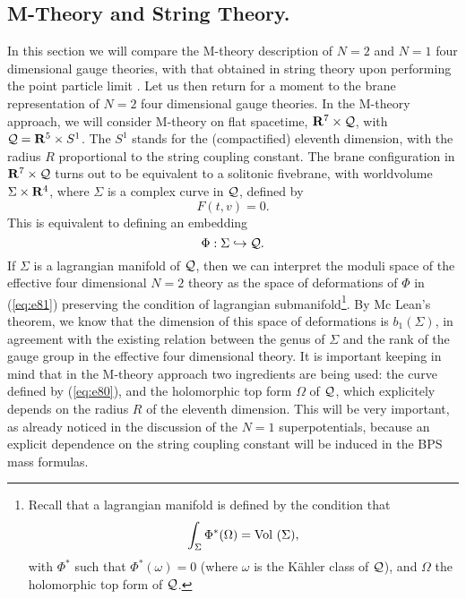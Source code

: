 \subsection{M-Theory and String Theory.}

In this section we will compare the M-theory description of $N=2$ and $N=1$ 
four dimensional gauge theories, with that obtained in string theory upon 
performing the point particle limit \cite{KKLMV,GHL1,KLMVW,GHL2}. Let us then return for a moment to the 
brane representation of $N=2$ four dimensional gauge theories. In the 
M-theory approach, we will consider M-theory on flat spacetime, ${\bf R}^7 \times {\cal Q}$, 
with ${\cal Q}= {\bf R}^5 \times S^1$. The $S^1$ stands for the (compactified)  
eleventh dimension, with the radius $R$ proportional to the string coupling constant. 
The brane configuration in ${\bf R}^7 \times {\cal Q}$ turns out to be 
equivalent to a solitonic fivebrane, with worldvolume $\Sigma \times {\bf R}^4$, where 
$\Sigma$ is a complex curve in ${\cal Q}$, defined by
\begin{equation}
F(t,v)=0.
\label{eq:e80}
\end{equation}
This is equivalent to defining an embedding
\begin{equation}
\Phi : \Sigma \hookrightarrow {\cal Q}.
\label{eq:e81}
\end{equation}
If $\Sigma$ is a lagrangian manifold of ${\cal Q}$, then we can interpret the 
moduli space of the effective four dimensional $N=2$ theory as the space of 
deformations of $\Phi$ in (\ref{eq:e81}) preserving the condition of 
lagrangian submanifold\footnote{Recall that a lagrangian manifold is defined 
by the condition that 
\[ \int_{\Sigma} \Phi^* (\Omega) = \hbox {Vol } (\Sigma), \]
with $\Phi^*$ such that $\Phi^*(\omega)=0$ (where $\omega$ is the K\"ahler class 
of ${\cal Q}$), and $\Omega$ the holomorphic top form of ${\cal Q}$.}. By 
Mc Lean's theorem, we know that the dimension of this space of deformations 
is $b_1(\Sigma)$, in agreement with the existing relation between the genus of 
$\Sigma$ and the rank of the gauge group in the effective four dimensional 
theory. It is important keeping in mind that in the M-theory approach two 
ingredients are being used: the curve defined by (\ref{eq:e80}), and the holomorphic 
top form $\Omega$ of ${\cal Q}$, which explicitely depends on the radius $R$ 
of the eleventh dimension. This will be very important, as already noticed 
in the discussion of the $N=1$ superpotentials, because an explicit dependence 
on the string coupling constant will be induced in the BPS mass formulas.
  
